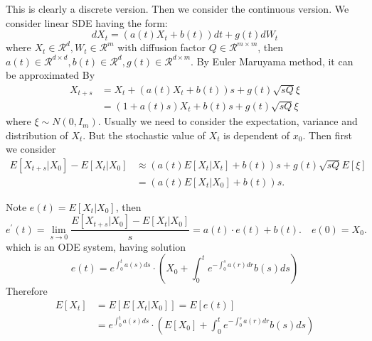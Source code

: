 This is clearly a discrete version. Then we consider the continuous version.
We consider linear SDE having the form:
\begin{equation}
    dX_t = (a(t)X_t + b(t))dt + g(t)dW_t
\end{equation}
where $X_t\in \mathcal{R}^d, W_t\in \mathcal{R}^m$ with diffusion factor $Q\in \mathcal{R}^{m\times m}$, then $a(t)\in \mathcal{R}^{d\times d}, b(t)\in \mathcal{R}^d, g(t)\in \mathcal{R}^{d\times m}$. 
By Euler Maruyama method, it can be approximated By
\begin{equation}
    \begin{aligned}
        X_{t+s}&=X_t + (a(t)X_t + b(t))s+g(t)\sqrt{sQ}\xi\\
        &=(1+a(t)s)X_t + b(t)s + g(t)\sqrt{sQ}\xi
    \end{aligned}
\end{equation}
where $\xi\sim N(0, I_m)$. Usually we need to consider the expectation, variance and distribution of $X_t$. But the stochastic value of $X_t$ is dependent of $x_0$. Then first we consider
\begin{equation}
    \begin{aligned}
    E\left[X_{t+s} | X_{0}\right]-E\left[X_{t} | X_{0}\right] & \approx\left(a(t) E\left[X_{t} | X_{t}\right]+b(t)\right) s+g(t) \sqrt{sQ} E[\xi] \\
    & =\left(a(t) E\left[X_{t} | X_{0}\right]+b(t)\right) s .
    \end{aligned}
\end{equation}


Note  $e(t)=E\left[X_{t} | X_{0}\right]$, then
\begin{equation}
    e^{\prime}(t)=\lim _{s \rightarrow 0} \frac{E\left[X_{t+s} | X_{0}\right]-E\left[X_{t} | X_{0}\right]}{s}=a(t) \cdot e(t)+b(t) . \quad e(0)=X_{0} .    
\end{equation}
which is an ODE system, having solution
\begin{equation}
    e(t)=e^{\int_{0}^{t} a(s) d s}\cdot\left(X_{0}+\int_{0}^{t} e^{-\int_{0}^{s} a(r) d r} b(s) d s\right)
\end{equation}
Therefore
\begin{equation}
    \begin{aligned}
    E\left[X_{t}\right] & =E\left[E\left[X_{t} | X_{0}\right]\right]=E[e(t)] \\
    & =e^{\int_{0}^{t} a(s) d s}\cdot\left(E\left[X_{0}\right]+\int_{0}^{t} e^{-\int_{0}^{s} a(r) d r} b(s) d s\right) 
    \end{aligned}
\end{equation}

